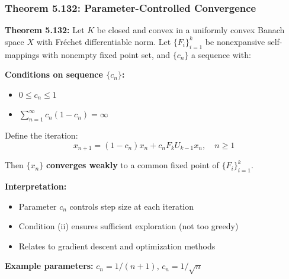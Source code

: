 \documentclass[aspectratio=169,10pt]{beamer}
\begin{document}
\begin{frame}[fragile]
\frametitle{Theorem 5.132: Parameter-Controlled Convergence}

\textbf{Theorem 5.132:} Let $K$ be closed and convex in a uniformly convex Banach space $X$ with Fréchet differentiable norm.
Let $\{F_i\}_{i=1}^k$ be nonexpansive self-mappings with nonempty fixed point set, and $\{c_n\}$ a sequence with:

\vspace{0.2cm}

\textbf{Conditions on sequence $\{c_n\}$:}
\begin{itemize}
    \item[\textbf{(i)}] $0 \leq c_n \leq 1$
    \item[\textbf{(ii)}] $\sum_{n=1}^{\infty} c_n(1 - c_n) = \infty$
\end{itemize}

\vspace{0.2cm}

Define the iteration:
$$x_{n+1} = (1-c_n)x_n + c_n F_k U_{k-1} x_n, \quad n \geq 1$$

\vspace{0.2cm}

Then $\{x_n\}$ \textbf{converges weakly} to a common fixed point of $\{F_i\}_{i=1}^k$.

\vspace{0.3cm}

\textbf{Interpretation:}
\begin{itemize}
    \item Parameter $c_n$ controls step size at each iteration
    \item Condition (ii) ensures sufficient exploration (not too greedy)
    \item Relates to gradient descent and optimization methods
\end{itemize}

\vspace{0.2cm}

\textbf{Example parameters:} $c_n = 1/(n+1)$, $c_n = 1/\sqrt{n}$

\end{frame}
\end{document}
